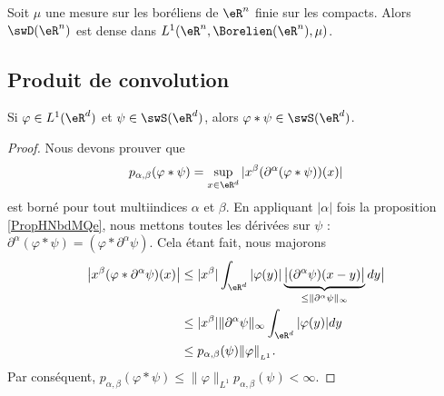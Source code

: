 \begin{theorem}      \label{ThoRWEoqY}
    Soit \( \mu\) une mesure sur les boréliens de \( \eR^n\) finie sur les compacts. Alors \( \swD(\eR^n)\) est dense dans \( L^1(\eR^n,\Borelien(\eR^n),\mu)\).
\end{theorem}


\subsection{Produit de convolution}

\begin{proposition}     \label{PROPooUNFYooYdbSbJ}
    Si \( \varphi\in L^1(\eR^d)\) et \( \psi\in\swS(\eR^d)\), alors \( \varphi * \psi\in \swS(\eR^d)\).
\end{proposition}

\begin{proof}
    Nous devons prouver que
    \begin{equation}
        p_{\alpha,\beta}(\varphi*\psi)=\sup_{x\in \eR^d}| x^{\beta}(\partial^{\alpha}(\varphi*\psi))(x) |
    \end{equation}
    est borné pour tout multiindices \( \alpha\) et \( \beta\). En appliquant \( | \alpha |\) fois la proposition \ref{PropHNbdMQe}, nous mettons toutes les dérivées sur \( \psi\) : \( \partial^{\alpha}(\varphi*\psi)=(\varphi*\partial^{\alpha}\psi)\). Cela étant fait, nous majorons
    \begin{subequations}
        \begin{align}
            \big| x^{\beta}(\varphi*\partial^{\alpha}\psi)(x) \big|&\leq| x^{\beta} |\int_{\eR^d} |\varphi(y)|\underbrace{\big| (\partial^{\alpha}\psi)(x-y)\big|}_{\leq\| \partial^{\alpha}\psi \|_{\infty}} dy \big|\\
            &\leq | x^{\beta} |  \| \partial^{\alpha}\psi \|_{\infty}\int_{\eR^d}| \varphi(y) |dy\\
            &\leq p_{\alpha,\beta}(\psi)\| \varphi \|_{_{L^1}}.
        \end{align}
    \end{subequations}
    Par conséquent, \( p_{\alpha,\beta}(\varphi*\psi)\leq \| \varphi \|_{L^1}p_{\alpha,\beta}(\psi)<\infty\).
\end{proof}



